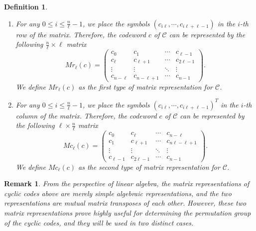 \documentclass[journal,12pt,onecolumn]{IEEEtran}
\newtheorem{remark}{Remark}
\newtheorem{definition}{Definition}
\begin{document}
 
\begin{definition}
    ~
    \begin{enumerate}
        \item For any $0\le i\le \frac{n}{\ell}-1$, we place the symbols $(c_{i\ell},\cdots,c_{i\ell+\ell-1})$ in the $i$-th row of the matrix. Therefore, the codeword $c$ of $\mathcal{C}$ can be represented by the following $\frac{n}{\ell}\times\ell$ matrix
        \[
            Mr_{\ell}(c) = \begin{pmatrix}
                c_0 & c_1 & \cdots & c_{\ell-1} \\
                c_{\ell} & c_{\ell+1} & \cdots & c_{2\ell-1} \\
                \vdots & \vdots & \ddots & \vdots \\
                c_{n-\ell} & c_{n-\ell+1} & \cdots & c_{n-1}
            \end{pmatrix}. 
        \]
        We define $Mr_{\ell}(c)$ as the first type of matrix representation for $\mathcal{C}$.
        \item For any $0\le i\le \frac{n}{\ell}-1$, we place the symbols $(c_{i\ell},\cdots,c_{i\ell+\ell-1})^T$ in the $i$-th column of the matrix. Therefore, the codeword $c$ of $\mathcal{C}$ can be represented by the following $\ell\times\frac{n}{\ell}$ matrix 
        \[
            Mc_{\ell}(c) = \begin{pmatrix}
                c_0 & c_{\ell} & \cdots & c_{n-\ell} \\
                c_{1} & c_{\ell+1} & \cdots & c_{n\ell-\ell+1} \\
                \vdots & \vdots & \ddots & \vdots \\
                c_{\ell-1} & c_{2\ell-1} & \cdots & c_{n-1}
            \end{pmatrix}. 
        \]
        We define $Mc_{\ell}(c)$ as the second type of matrix representation for $\mathcal{C}$.
    \end{enumerate}
\end{definition}
\begin{remark}
    From the perspective of linear algebra, the matrix representations of cyclic codes above are merely simple algebraic representations, and the two representations are mutual matrix transposes of each other. However, these two matrix representations prove highly useful for determining the permutation group of the cyclic codes, and they will be used in two distinct cases. 
\end{remark}
\end{document}
